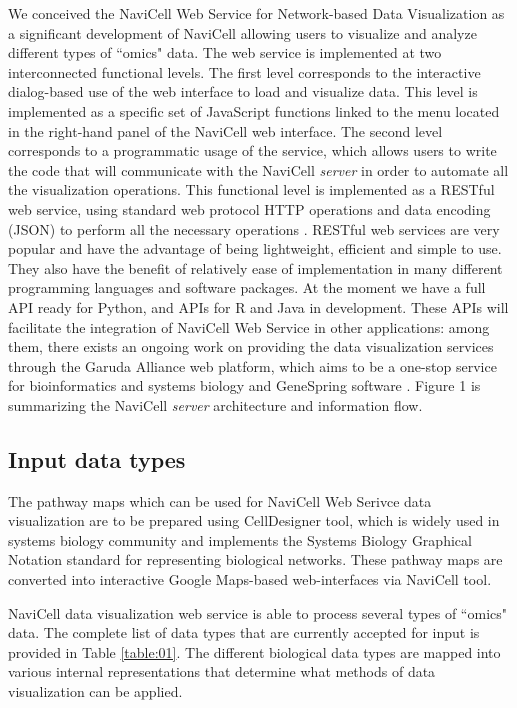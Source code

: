 \documentclass[a4,center,fleqn]{NAR}
\begin{document}
We conceived the NaviCell Web Service for Network-based Data Visualization
as a significant development of NaviCell \cite{kuperstein2013navicell} 
allowing users to visualize and analyze different types of ``omics" data. The web service
is implemented at two interconnected functional levels.
The first level corresponds to the interactive dialog-based
use of the web interface to load and visualize data. This level is implemented
as a specific set of JavaScript functions linked to the menu located
in the right-hand panel of the NaviCell web interface. The second level corresponds to a
programmatic usage of the service, which allows users to write the code that will
communicate with the NaviCell \emph{server} in order to automate all the
visualization operations. This functional level is implemented as a RESTful web
service, using standard web protocol HTTP operations and data encoding (JSON)
to perform all the necessary operations \cite{fielding2002principled}.
RESTful web services are very popular and have the advantage of being
lightweight, efficient and simple to use. They also have the benefit of
relatively ease of implementation in many different programming languages and
software packages. At the moment we have a full API ready for Python, and
APIs for R and Java in development. These APIs will facilitate the integration
of NaviCell Web Service in other applications: among them, there exists an
ongoing work on providing the data visualization services through the Garuda
Alliance web platform, which aims to be a one-stop service for bioinformatics
and systems biology \cite{ghosh2011software} and GeneSpring software
\cite{Chu2001}. Figure 1 is summarizing the NaviCell \emph{server} architecture
and information flow.

\subsection{Input data types}

The pathway maps which can be used for NaviCell Web Serivce data visualization
are to be prepared using CellDesigner tool\cite{Funahashi2008}, which is widely used in systems biology
community and implements the Systems Biology Graphical Notation standard \cite{LeNovere2009}
for representing biological networks. These pathway maps are converted into
interactive Google Maps-based web-interfaces via NaviCell tool\cite{kuperstein2013navicell}.

NaviCell data visualization web service is able to process
several types of ``omics" data. The complete list of data types that are
currently accepted for input is provided in Table \ref{table:01}. The different biological data
types are mapped into various internal representations that determine what methods
of data visualization can be applied.
\end{document}
